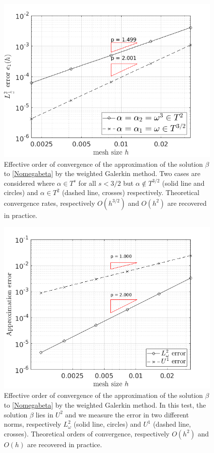 \documentclass[a4paper]{article}
\begin{document}
\begin{figure}[H]
	\centering
	\hspace{-1cm}\includegraphics[scale = 0.4]{figs/ordreCVDir}
	\caption{Effective order of convergence of the approximation of the solution $\beta$ to \eqref{Nomegabeta} by the weighted Galerkin method. Two cases are considered where $\alpha \in T^s$ for all $s < 3/2$ but $\alpha \notin T^{3/2}$ (solid line and circles) and $\alpha \in T^2$ (dashed line, crosses) respectively. Theoretical convergence rates, respectively $O(h^{3/2})$ and $O(h^2)$ are recovered in practice.} 
	\label{fig:errL2dir}
\end{figure}
\begin{figure}[H]
	\centering
	\hspace{-1cm}\includegraphics[scale = 0.4]{figs/ordreCVNeu}
	\caption{Effective order of convergence of the approximation of the solution $\beta$ to \eqref{Nomegabeta} by the weighted Galerkin method. In this test, the solution $\beta$ lies in $U^2$ and we measure the error in two different norms, respectively $L^2_\omega$ (solid line, circles) and $U^1$ (dashed line, crosses). Theoretical orders of convergence, respectively $O(h^2)$ and $O(h)$ are recovered in practice. } 
	\label{fig:errL2Neu}
\end{figure}
\end{document}

